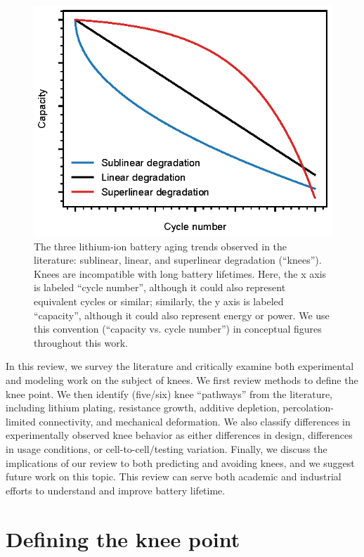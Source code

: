 \documentclass{article}
\newcommand{\editreadybox}[1]{{
\fbox{
\parbox{0.8\textwidth}{  \fbox{$\triangleright$\textcolor{green}{\textbf{READY TO EDIT}:}} 
#1
}}}}
\begin{document}
\begin{figure}[ht]
\centering
\includegraphics[scale=1]{figures/degradation_rates.eps}
\caption{The three lithium-ion battery aging trends observed in the literature: sublinear, linear, and superlinear degradation (``knees''). Knees are incompatible with long battery lifetimes. Here, the x axis is labeled ``cycle number'', although it could also represent equivalent cycles or similar; similarly, the y axis is labeled ``capacity'', although it could also represent energy or power. We use this convention (``capacity vs. cycle number'') in conceptual figures throughout this work.}
\label{fig:degradation_shapes}
\end{figure}


In this review, we survey the literature and critically examine both experimental and modeling work on the subject of knees. We first review methods to define the knee point. We then identify (five/six) knee ``pathways'' from the literature, including lithium plating, resistance growth, additive depletion, percolation-limited connectivity, and mechanical deformation. We also classify differences in experimentally observed knee behavior as either differences in design, differences in usage conditions, or cell-to-cell/testing variation. Finally, we discuss the implications of our review to both predicting and avoiding knees, and we suggest future work on this topic. This review can serve both academic and industrial efforts to understand and improve battery lifetime.

\section{Defining the knee point}
\end{document}
